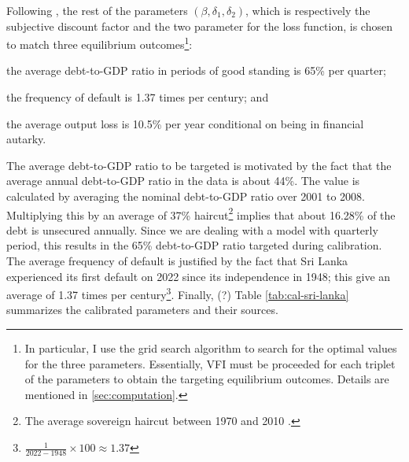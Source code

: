 Following \citet{Na-18}, the rest of the parameters $\left( \beta, \delta_1, \delta_2 \right)$, which is respectively the subjective discount factor and the two parameter for the loss function, is chosen to match three equilibrium outcomes\footnote{
    In particular, I use the grid search algorithm to search for the optimal values for the three parameters. Essentially, VFI must be proceeded for each triplet of the parameters to obtain the targeting equilibrium outcomes. Details are mentioned in \autoref{sec:computation}.
}:
\begin{enumerate*}[label = (\roman*)]
    \item the average debt-to-GDP ratio in periods of good standing is 65\% per quarter;
    \item the frequency of default is 1.37 times per century; and
    \item the average output loss is 10.5\% per year conditional on being in financial autarky.
\end{enumerate*}
The average debt-to-GDP ratio to be targeted is motivated by the fact that the average annual debt-to-GDP ratio in the data is about 44\%.
The value is calculated by averaging the nominal debt-to-GDP ratio over 2001 to 2008\footnotemark{}.
Multiplying this by an average of 37\% haircut\footnote{The average sovereign haircut between 1970 and 2010 \citep{Cruces-Trebesch-13}.} implies that about 16.28\% of the debt is unsecured annually\footnotemark{}.
Since we are dealing with a model with quarterly period, this results in the 65\% debt-to-GDP ratio targeted during calibration.
The average frequency of default is justified by the fact that Sri Lanka experienced its first default on 2022 since its independence in 1948; this give an average of 1.37 times per century\footnote{$\frac{1}{2022-1948} \times 100 \approx 1.37$}. Finally, (?)
Table \ref{tab:cal-sri-lanka} summarizes the calibrated parameters and their sources.

